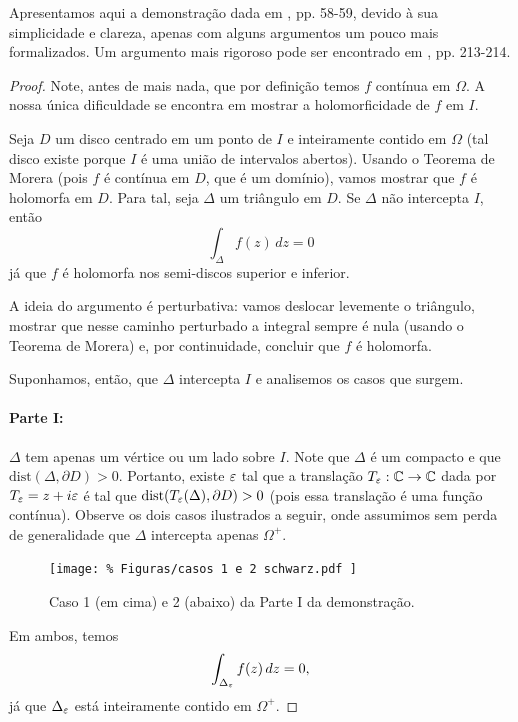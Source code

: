     Apresentamos aqui a demonstração dada em \cite{MR1976398}, pp. 58-59, 
    devido à sua simplicidade e clareza, apenas com alguns argumentos um pouco mais
    formalizados. Um argumento mais rigoroso pode ser encontrado em \cite{MR503901}, pp. 213-214.
    
    \begin{proof}
        Note, antes de mais nada, que por definição temos $f$ contínua em $\Omega$.
        A nossa única dificuldade se encontra em mostrar a holomorficidade de $f$ em $I$.
        
        Seja $D$ um disco centrado em um ponto de $I$ e inteiramente contido em $\Omega$
        (tal disco existe porque $I$ é uma união de intervalos abertos).
        Usando o Teorema de Morera (pois $f$ é contínua em $D$, que é um domínio), 
        vamos mostrar que $f$ é holomorfa em $D$. Para tal,
        seja $\Delta$ um triângulo em $D$. Se $\Delta$ não intercepta $I$, então
        \begin{equation*}
            \int_\Delta f(z) \, dz = 0
        \end{equation*}
        já que $f$ é holomorfa nos semi-discos superior e inferior.
        
        A ideia do argumento é perturbativa: vamos deslocar levemente o triângulo,
        mostrar que nesse caminho perturbado a integral sempre é nula 
        (usando o Teorema de Morera) e, por continuidade, concluir que $f$ é holomorfa.
        
        Suponhamos, então, que $\Delta$ intercepta $I$ e analisemos os casos que surgem.
        \paragraph{Parte I:} $\Delta$ tem apenas um vértice ou um lado sobre $I$. 
        Note que $\Delta$ é um compacto e que $\text{dist}(\Delta, \partial D) > 0$.
        Portanto, existe $\varepsilon$ tal que a translação $T_{\varepsilon}:\mathbb{C}\to\mathbb{C}$
        dada por $T_{\varepsilon} = z + i\varepsilon$ é tal que 
        $\text{dist}(T_{\varepsilon}(\Delta), \partial D) > 0$ (pois essa translação
        é uma função contínua). Observe os dois casos ilustrados a seguir, onde assumimos
        sem perda de generalidade que $\Delta$ intercepta apenas $\Omega^+$.
        \begin{figure}[H]\centering
            \texttt{[image: \%
                Figuras/casos 1 e 2 schwarz.pdf
            ]}
            \caption{Caso 1 (em cima) e 2 (abaixo) da Parte I da demonstração.}
        \end{figure}
        Em ambos, temos
        \begin{equation*}
            \int_{\Delta_{\varepsilon}} f(z)\, dz = 0,
        \end{equation*}
        já que $\Delta_{\varepsilon}$ está inteiramente contido em $\Omega^+$.
        

\end{proof}
